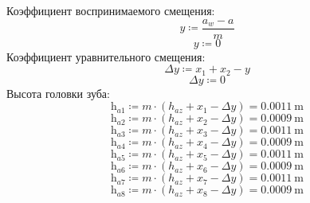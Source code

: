\documentclass{article}
\newcommand{\defeq}{\coloneq} %
\begin{document}
\colorbox[HTML]{000000}{Коэффициент воспринимаемого смещения:}\newline
\begin{equation*}
y \defeq \frac{a_{w}-a}{m}
\end{equation*}
\begin{equation*}
y \defeq 0
\end{equation*}
\colorbox[HTML]{000000}{Коэффициент уравнительного смещения:}\newline
\begin{equation*}
Δy \defeq \textit{x}_{\textit{1}}+\textit{x}_{\textit{2}}-y
\end{equation*}
\begin{equation*}
Δy \defeq 0
\end{equation*}
\colorbox[HTML]{000000}{Высота головки зуба:}\newline
\begin{equation*}
\textit{h}_{\textit{a1}} \defeq m \cdot \left( h_{az}+\textit{x}_{\textit{1}}-Δy \right) = {0.0011 \: \mathrm{m}}
\end{equation*}
\begin{equation*}
\textit{h}_{\textit{a2}} \defeq m \cdot \left( h_{az}+\textit{x}_{\textit{2}}-Δy \right) = {0.0009 \: \mathrm{m}}
\end{equation*}
\begin{equation*}
\textit{h}_{\textit{a3}} \defeq m \cdot \left( h_{az}+\textit{x}_{\textit{3}}-Δy \right) = {0.0011 \: \mathrm{m}}
\end{equation*}
\begin{equation*}
\textit{h}_{\textit{a4}} \defeq m \cdot \left( h_{az}+\textit{x}_{\textit{4}}-Δy \right) = {0.0009 \: \mathrm{m}}
\end{equation*}
\begin{equation*}
\textit{h}_{\textit{a5}} \defeq m \cdot \left( h_{az}+\textit{x}_{\textit{5}}-Δy \right) = {0.0011 \: \mathrm{m}}
\end{equation*}
\begin{equation*}
\textit{h}_{\textit{a6}} \defeq m \cdot \left( h_{az}+\textit{x}_{\textit{6}}-Δy \right) = {0.0009 \: \mathrm{m}}
\end{equation*}
\begin{equation*}
\textit{h}_{\textit{a7}} \defeq m \cdot \left( h_{az}+\textit{x}_{\textit{7}}-Δy \right) = {0.0011 \: \mathrm{m}}
\end{equation*}
\begin{equation*}
\textit{h}_{\textit{a8}} \defeq m \cdot \left( h_{az}+\textit{x}_{\textit{8}}-Δy \right) = {0.0009 \: \mathrm{m}}
\end{equation*}
\end{document}
